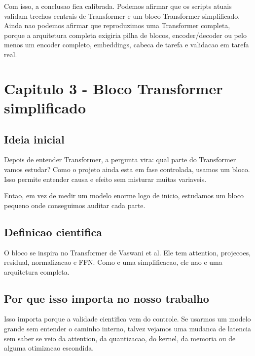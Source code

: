 Com isso, a conclusao fica calibrada. Podemos afirmar que os scripts atuais validam trechos centrais de Transformer e um bloco Transformer simplificado. Ainda nao podemos afirmar que reproduzimos uma Transformer completa, porque a arquitetura completa exigiria pilha de blocos, encoder/decoder ou pelo menos um encoder completo, embeddings, cabeca de tarefa e validacao em tarefa real.



\section{Capitulo 3 - Bloco Transformer simplificado}



\subsection{Ideia inicial}





Depois de entender Transformer, a pergunta vira: qual parte do Transformer vamos estudar? Como o projeto ainda esta em fase controlada, usamos um bloco. Isso permite entender causa e efeito sem misturar muitas variaveis.




Entao, em vez de medir um modelo enorme logo de inicio, estudamos um bloco pequeno onde conseguimos auditar cada parte.



\subsection{Definicao cientifica}





O bloco se inspira no Transformer de Vaswani et al. Ele tem attention, projecoes, residual, normalizacao e FFN. Como e uma simplificacao, ele nao e uma arquitetura completa.



\subsection{Por que isso importa no nosso trabalho}






Isso importa porque a validade cientifica vem do controle. Se usarmos um modelo grande sem entender o caminho interno, talvez vejamos uma mudanca de latencia sem saber se veio da attention, da quantizacao, do kernel, da memoria ou de alguma otimizacao escondida.



